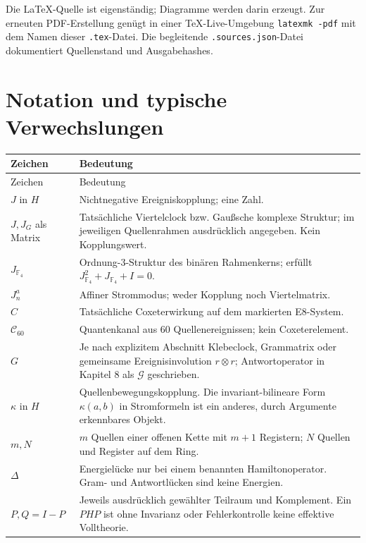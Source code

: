 \documentclass[11pt,a4paper,oneside,parskip=half,headings=normal,numbers=noenddot,bibliography=totoc]{scrreprt}
\newcommand{\F}{\mathbb F}
\begin{document}
Die LaTeX-Quelle ist eigenständig; Diagramme werden darin erzeugt. Zur erneuten PDF-Erstellung genügt in einer TeX-Live-Umgebung \texttt{latexmk -pdf} mit dem Namen dieser \texttt{.tex}-Datei. Die begleitende \texttt{.sources.json}-Datei dokumentiert Quellenstand und Ausgabehashes.

\section{Notation und typische Verwechslungen}
\begin{longtable}{@{}P{.2\textwidth}P{.72\textwidth}@{}}
\toprule Zeichen & Bedeutung\\\midrule\endfirsthead
\toprule Zeichen & Bedeutung\\\midrule\endhead
$J$ in $H$ & Nichtnegative Ereigniskopplung; eine Zahl.\\
$J,J_G$ als Matrix & Tatsächliche Viertelclock bzw. Gaußsche komplexe Struktur; im jeweiligen Quellenrahmen ausdrücklich angegeben. Kein Kopplungswert.\\
$J_{\F_4}$ & Ordnung-3-Struktur des binären Rahmenkerns; erfüllt $J_{\F_4}^2+J_{\F_4}+I=0$.\\
$J_n^a$ & Affiner Strommodus; weder Kopplung noch Viertelmatrix.\\
$C$ & Tatsächliche Coxeterwirkung auf dem markierten E8-System.\\
$\mathcal C_{60}$ & Quantenkanal aus 60 Quellenereignissen; kein Coxeterelement.\\
$G$ & Je nach explizitem Abschnitt Klebeclock, Grammatrix oder gemeinsame Ereignisinvolution $r\otimes r$; Antwortoperator in Kapitel 8 als $\mathcal G$ geschrieben.\\
$\kappa$ in $H$ & Quellenbewegungskopplung. Die invariant-bilineare Form $\kappa(a,b)$ in Stromformeln ist ein anderes, durch Argumente erkennbares Objekt.\\
$m,N$ & $m$ Quellen einer offenen Kette mit $m+1$ Registern; $N$ Quellen und Register auf dem Ring.\\
$\Delta$ & Energielücke nur bei einem benannten Hamiltonoperator. Gram- und Antwortlücken sind keine Energien.\\
$P,Q=I-P$ & Jeweils ausdrücklich gewählter Teilraum und Komplement. Ein $PHP$ ist ohne Invarianz oder Fehlerkontrolle keine effektive Volltheorie.\\\bottomrule
\end{longtable}

\appendix
\end{document}

